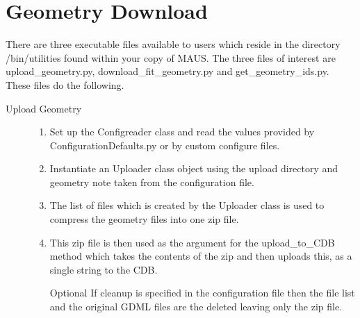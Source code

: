 \section{Geometry Download}

There are three executable files available to users which reside in
the directory /bin/utilities found within your copy of MAUS. The three
files of interest are upload\_geometry.py, download\_fit\_geometry.py
and get\_geometry\_ids.py. These files do the following.

\begin{description}
  \item[Upload Geometry] \hfill 
  \begin{enumerate}
   \item Set up the Configreader class and read the values provided by
   ConfigurationDefaults.py or by custom configure files.
   \item Instantiate an Uploader class object using the upload
   directory and geometry note taken from the configuration file.
   \item The list of files which is created by the Uploader class is
   used to compress the geometry files into one zip file.
   \item This zip file is then used as the argument for the
upload\_to\_CDB method which takes the contents of the zip and then
uploads this, as a single string to the CDB.
   \item[Optional] If cleanup is specified in the configuration file
then the file list and the original GDML files are the deleted leaving
only the zip file.
  \end{enumerate}


\end{description}
